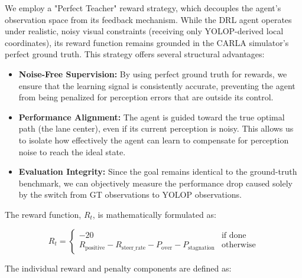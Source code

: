 \documentclass[sn-mathphys,Numbered]{sn-jnl}
\begin{document}
We employ a "Perfect Teacher" reward strategy, which decouples the agent's observation space from its feedback mechanism. While the DRL agent operates under realistic, noisy visual constraints (receiving only YOLOP-derived local coordinates), its reward function remains grounded in the CARLA simulator's perfect ground truth. This strategy offers several structural advantages:
\begin{itemize}
    \item \textbf{Noise-Free Supervision:} By using perfect ground truth for rewards, we ensure that the learning signal is consistently accurate, preventing the agent from being penalized for perception errors that are outside its control.
    \item \textbf{Performance Alignment:} The agent is guided toward the true optimal path (the lane center), even if its current perception is noisy. This allows us to isolate how effectively the agent can learn to compensate for perception noise to reach the ideal state.
    \item \textbf{Evaluation Integrity:} Since the goal remains identical to the ground-truth benchmark, we can objectively measure the performance drop caused solely by the switch from GT observations to YOLOP observations.
\end{itemize}

The reward function, $R_t$, is mathematically formulated as:

\begin{equation}
\label{eq:reward}
R_t = \begin{cases}
-20 & \text{if done} \\
R_{\text{positive}} - R_{\text{steer\_rate}} - P_{\text{over}} - P_{\text{stagnation}} & \text{otherwise}
\end{cases}
\end{equation}

The individual reward and penalty components are defined as:
\end{document}
